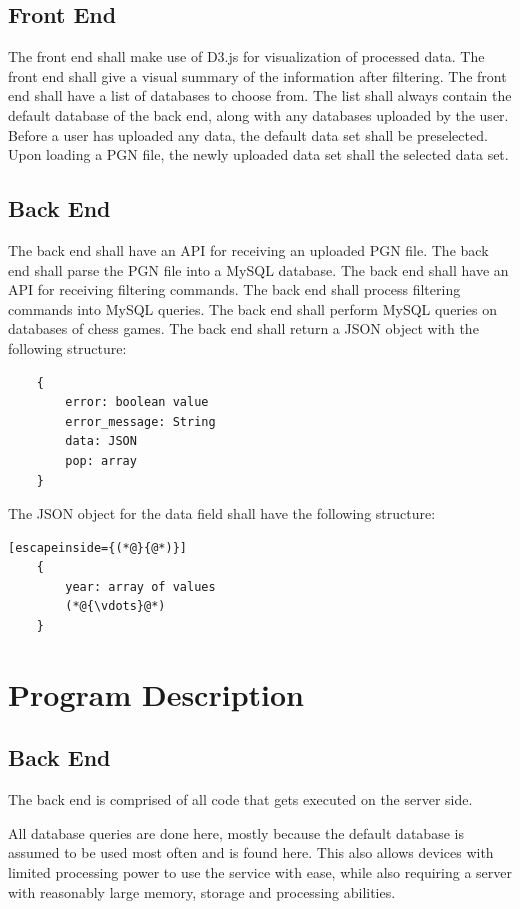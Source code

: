 \documentclass{article}
\begin{document}
\subsection{Front End}
The front end shall make use of D3.js for visualization of processed data.
The front end shall give a visual summary of the information after filtering.
The front end shall have a list of databases to choose from.  The list
shall always contain the default database of the back end, along
with any databases uploaded by the user.
Before a user has uploaded any data, the default data set \cite{def_db} shall
be preselected.
Upon loading a PGN file, the newly uploaded data set shall the selected
data set.

\subsection{Back End}
The back end shall have an API for receiving an uploaded PGN file.
The back end shall parse the PGN file into a MySQL database.
The back end shall have an API for receiving filtering commands.
The back end shall process filtering commands into MySQL queries.
The back end shall perform MySQL queries on databases of chess games.
The back end shall return a JSON object with the following structure:
\begin{lstlisting}
	{
		error: boolean value
		error_message: String
		data: JSON
		pop: array
	}
\end{lstlisting}
The JSON object for the data field shall have the following structure:
\begin{lstlisting}[escapeinside={(*@}{@*)}]
	{
		year: array of values
		(*@{\vdots}@*)
	}
\end{lstlisting}

\section{Program Description}

\subsection{Back End}
The back end is comprised of all code that gets executed on the server side.

All database queries are done here, mostly because the default database is
assumed to be used most often and is found here. This also allows devices
with limited processing power to use the service with ease, while also
requiring a server with reasonably large memory, storage and
processing abilities.
\end{document}
